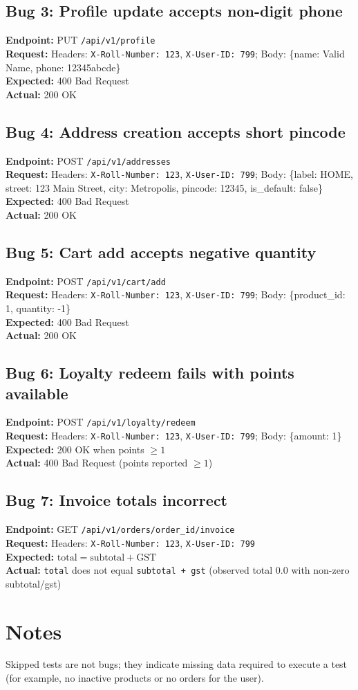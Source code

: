 \documentclass[11pt]{article}
\begin{document}
\subsection*{Bug 3: Profile update accepts non-digit phone}
\textbf{Endpoint:} PUT \texttt{/api/v1/profile} \\
\textbf{Request:} Headers: \texttt{X-Roll-Number: 123}, \texttt{X-User-ID: 799}; Body: \{name: Valid Name, phone: 12345abcde\} \\
\textbf{Expected:} 400 Bad Request \\
\textbf{Actual:} 200 OK

\subsection*{Bug 4: Address creation accepts short pincode}
\textbf{Endpoint:} POST \texttt{/api/v1/addresses} \\
\textbf{Request:} Headers: \texttt{X-Roll-Number: 123}, \texttt{X-User-ID: 799}; Body: \{label: HOME, street: 123 Main Street, city: Metropolis, pincode: 12345, is\_default: false\} \\
\textbf{Expected:} 400 Bad Request \\
\textbf{Actual:} 200 OK

\subsection*{Bug 5: Cart add accepts negative quantity}
\textbf{Endpoint:} POST \texttt{/api/v1/cart/add} \\
\textbf{Request:} Headers: \texttt{X-Roll-Number: 123}, \texttt{X-User-ID: 799}; Body: \{product\_id: 1, quantity: -1\} \\
\textbf{Expected:} 400 Bad Request \\
\textbf{Actual:} 200 OK

\subsection*{Bug 6: Loyalty redeem fails with points available}
\textbf{Endpoint:} POST \texttt{/api/v1/loyalty/redeem} \\
\textbf{Request:} Headers: \texttt{X-Roll-Number: 123}, \texttt{X-User-ID: 799}; Body: \{amount: 1\} \\
\textbf{Expected:} 200 OK when points \(\ge 1\) \\
\textbf{Actual:} 400 Bad Request (points reported \(\ge 1\))

\subsection*{Bug 7: Invoice totals incorrect}
\textbf{Endpoint:} GET \texttt{/api/v1/orders/{order\_id}/invoice} \\
\textbf{Request:} Headers: \texttt{X-Roll-Number: 123}, \texttt{X-User-ID: 799} \\
\textbf{Expected:} \(\text{total} = \text{subtotal} + \text{GST}\) \\
\textbf{Actual:} \texttt{total} does not equal \texttt{subtotal + gst} (observed total 0.0 with non-zero subtotal/gst)

\section*{Notes}
Skipped tests are not bugs; they indicate missing data required to execute a test (for example, no inactive products or no orders for the user).
\end{document}
